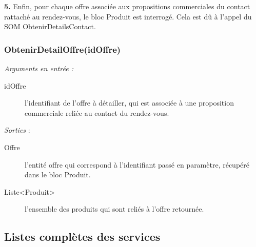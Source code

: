 \begin{shaded}
\textbf{5.} Enfin, pour chaque offre associée aux propositions commerciales du contact rattaché au rendez-vous, le bloc Produit est interrogé. Cela est dû à l'appel du SOM ObtenirDetailsContact. 
\end{shaded}


\subsubsection{ObtenirDetailOffre(idOffre)}

\noindent \textit{Arguments en entrée :} 
\begin{description}
\item[idOffre] l'identifiant de l'offre à détailler, qui est associée à une proposition commerciale reliée au contact du rendez-vous. \\
\end{description} 

\noindent \textit{Sorties} :
\begin{description}
\item[Offre] l'entité offre qui correspond à l'identifiant passé en paramètre, récupéré dans le bloc Produit. 
\item[Liste<Produit>] l'ensemble des produits qui sont reliés à l'offre retournée.
\end{description} 
\restoregeometry
\subsection{Listes complètes des services}

